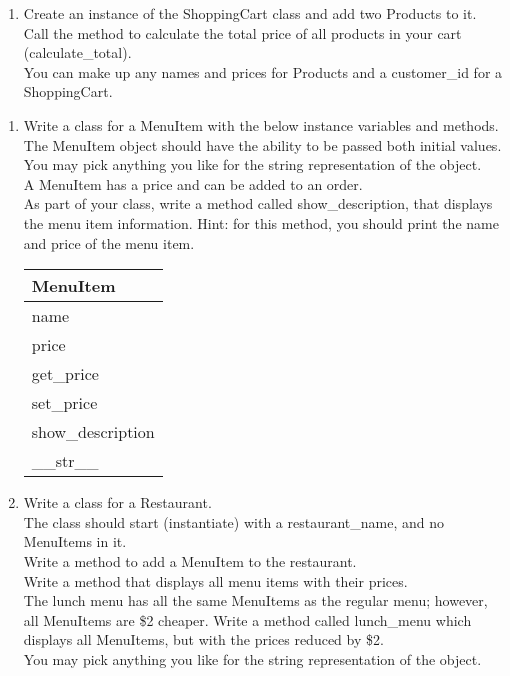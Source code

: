 \begin{enumerate}
		\item
			Create an instance of the ShoppingCart class and add two Products to it.\\
			Call the method to calculate the total price of all products in your cart (calculate\_total).\\
			You can make up any names and prices for Products and a customer\_id for a ShoppingCart.\\
	\end{enumerate}
\pagebreak




	\item
	\begin{enumerate}
		\item
			Write a class for a MenuItem with the below instance variables and methods.\\ 
			The MenuItem object should have the ability to be passed both initial values.\\  
			You may pick anything you like for the string representation of the object.\\
			A MenuItem has a price and can be added to an order.\\  
			As part of your class, write a method called show\_description, that displays the menu item information.
			Hint: for this method, you should print the name and price of the menu item.
			\begin{flushright}
			\begin{tabular}{|l|}
				\hline
				MenuItem\\ \hline
				name\\	price\\	 \hline
				get\_price \\ set\_price \\ show\_description \\ \_\_str\_\_ \\ \hline
			\end{tabular}
			\end{flushright}

		\item
			Write a class for a Restaurant. \\
			The class should start (instantiate) with a restaurant\_name, and no MenuItems in it. \\ 
			Write a method to add a MenuItem to the restaurant.\\
			Write a method that displays all menu items with their prices.\\
			The lunch menu has all the same MenuItems as the regular menu; however, all MenuItems are \$2 cheaper.
			Write a method called lunch\_menu which displays all MenuItems, but with the prices reduced by \$2. \\	
			You may pick anything you like for the string representation of the object.
	

\end{enumerate}

